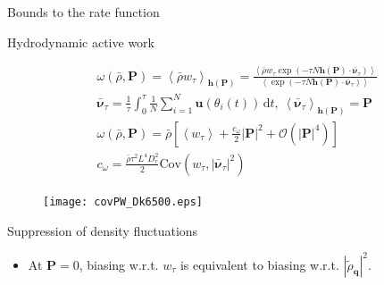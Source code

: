 \documentclass{beamer}
\begin{document}
{\begin{frame}[noframenumbering]{Bounds to the rate function}

\end{frame}

\begin{frame}[noframenumbering]{Hydrodynamic active work}

\begin{eqnarray}
& \omega(\bar{\rho}, \boldsymbol{P}) = \left<\bar{\rho} w_{\tau}\right>_{\boldsymbol{h}(\boldsymbol{P})} = \frac{\left<\bar{\rho} w_{\tau} \exp(-\tau N \boldsymbol{h}(\boldsymbol{P}) \cdot \bar{\boldsymbol{\nu}}_{\tau})\right>}{\left<\exp(-\tau N \boldsymbol{h}(\boldsymbol{P}) \cdot \bar{\boldsymbol{\nu}}_{\tau})\right>}\\
& \bar{\boldsymbol{\nu}}_{\tau} = \frac{1}{\tau} \int_0^{\tau} \frac{1}{N} \sum_{i=1}^N \boldsymbol{u}(\theta_i(t)) \, \mathrm{d}t,~ \left<\bar{\boldsymbol{\nu}}_{\tau}\right>_{\boldsymbol{h}(\boldsymbol{P})} = \boldsymbol{P}\\
& \omega(\bar{\rho}, \boldsymbol{P}) = \bar{\rho}\left[\left<w_{\tau}\right> + \frac{c_{\omega}}{2} |\boldsymbol{P}|^2 + \mathcal{O}(|\boldsymbol{P}|^4)\right]\\
& c_{\omega} = \frac{\bar{\rho} \tau^2 L^4 D_r^2}{2} \mathrm{Cov}(w_{\tau}, |\bar{\boldsymbol{\nu}}_{\tau}|^2)
\end{eqnarray}

\begin{figure}
\centering
\texttt{[image: covPW\_Dk6500.eps]}
\end{figure}

\end{frame}

\begin{frame}[noframenumbering]{Suppression of density fluctuations}


\vspace{-15pt}
\begin{itemize}
  \item At $\boldsymbol{P} = 0$, biasing w.r.t. $w_{\tau}$ is equivalent to biasing w.r.t. $|\tilde{\rho}_{\boldsymbol{q}}|^2$.
\end{itemize}


\end{frame}}
\end{document}
